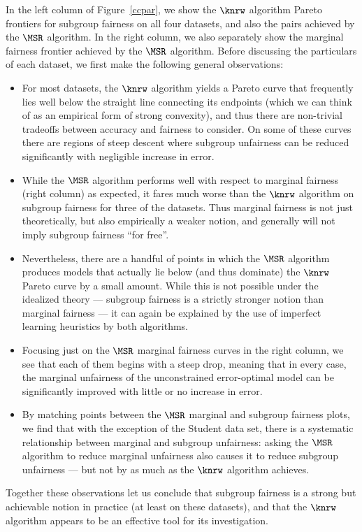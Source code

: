 In the left column of Figure~\ref{ccpar}, we show the $\knrw$ algorithm Pareto frontiers for subgroup fairness on all four datasets, and also the pairs
achieved by the $\MSR$ algorithm. In the right column, we also separately show the
marginal fairness frontier achieved by the $\MSR$ algorithm. Before discussing the particulars of each dataset,
we first make the following general observations:
\begin{itemize}
\item For most datasets, the $\knrw$ algorithm yields a Pareto curve that frequently lies well below the straight line
	connecting its endpoints (which we can think of as an empirical form of strong convexity),
	and thus there are non-trivial tradeoffs between accuracy and fairness to consider. On some of these
	curves there are regions of steep descent where subgroup unfairness can be reduced significantly
	with negligible increase in error.
\item While the $\MSR$ algorithm performs well with respect to marginal fairness (right column) as expected, it fares much
	worse than the $\knrw$ algorithm on subgroup fairness for three of the datasets. Thus marginal fairness
	is not just theoretically, but also empirically a weaker notion, and generally will not imply subgroup fairness
	``for free''.
\item Nevertheless, there are a handful of points in which the $\MSR$ algorithm produces
	models that actually lie below (and thus dominate) the $\knrw$ Pareto curve by a small amount.
	While this is not possible under the idealized theory --- subgroup fairness is a strictly stronger
	notion than marginal fairness --- it can again be explained by the use of imperfect learning heuristics
	by both algorithms.
\item Focusing just on the $\MSR$ marginal fairness curves in the right column, we see that each of them
	begins with a steep drop, meaning that in every case, the marginal unfairness of the unconstrained
	error-optimal model can be significantly improved with little or no increase in error.
\item By matching points between the $\MSR$ marginal and subgroup fairness plots, we find that
	with the exception of the Student data set, there is a systematic relationship between marginal and
	subgroup unfairness: asking the $\MSR$ algorithm to reduce marginal unfairness also causes it to
	reduce subgroup unfairness --- but not by as much as the $\knrw$ algorithm achieves.
\end{itemize}
Together these observations let us conclude that subgroup fairness is a strong but achievable notion in practice
(at least on these datasets), and that the $\knrw$ algorithm appears to be an effective tool for its investigation.

